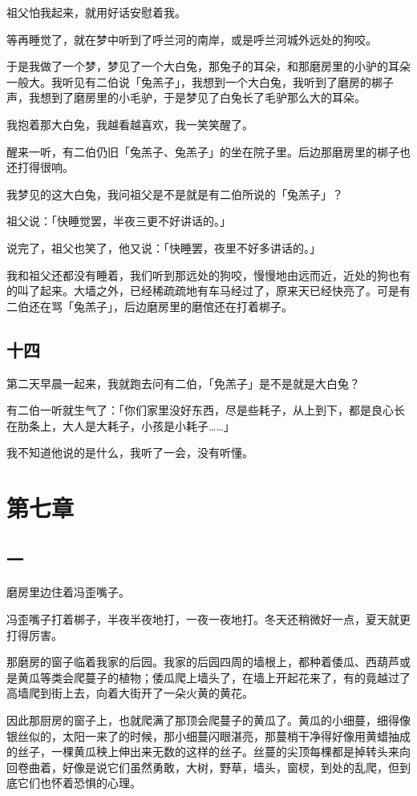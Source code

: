 \documentclass[UTF8]{ctexart}
\begin{document}
祖父怕我起来，就用好话安慰着我。

等再睡觉了，就在梦中听到了呼兰河的南岸，或是呼兰河城外远处的狗咬。

于是我做了一个梦，梦见了一个大白兔，那兔子的耳朵，和那磨房里的小驴的耳朵一般大。我听见有二伯说「兔羔子」，我想到一个大白兔，我听到了磨房的梆子声，我想到了磨房里的小毛驴，于是梦见了白兔长了毛驴那么大的耳朵。

我抱着那大白兔，我越看越喜欢，我一笑笑醒了。

醒来一听，有二伯仍旧「兔羔子、兔羔子」的坐在院子里。后边那磨房里的梆子也还打得很响。

我梦见的这大白兔，我问祖父是不是就是有二伯所说的「兔羔子」？

祖父说：「快睡觉罢，半夜三更不好讲话的。」

说完了，祖父也笑了，他又说：「快睡罢，夜里不好多讲话的。」

我和祖父还都没有睡着，我们听到那远处的狗咬，慢慢地由远而近，近处的狗也有的叫了起来。大墙之外，已经稀疏疏地有车马经过了，原来天已经快亮了。可是有二伯还在骂「兔羔子」，后边磨房里的磨倌还在打着梆子。

\subsection{十四}

第二天早晨一起来，我就跑去问有二伯，「免羔子」是不是就是大白兔？

有二伯一听就生气了：「你们家里没好东西，尽是些耗子，从上到下，都是良心长在肋条上，大人是大耗子，小孩是小耗子……」

我不知道他说的是什么，我听了一会，没有听懂。

\section{第七章}

\subsection{一}

磨房里边住着冯歪嘴子。

冯歪嘴子打着梆子，半夜半夜地打，一夜一夜地打。冬天还稍微好一点，夏天就更打得厉害。

那磨房的窗子临着我家的后园。我家的后园四周的墙根上，都种着倭瓜、西葫芦或是黄瓜等类会爬蔓子的植物；倭瓜爬上墙头了，在墙上开起花来了，有的竟越过了高墙爬到街上去，向着大街开了一朵火黄的黄花。

因此那厨房的窗子上，也就爬满了那顶会爬蔓子的黄瓜了。黄瓜的小细蔓，细得像银丝似的，太阳一来了的时候，那小细蔓闪眼湛亮，那蔓梢干净得好像用黄蜡抽成的丝子，一棵黄瓜秧上伸出来无数的这样的丝子。丝蔓的尖顶每棵都是掉转头来向回卷曲着，好像是说它们虽然勇敢，大树，野草，墙头，窗棂，到处的乱爬，但到底它们也怀着恐惧的心理。
\end{document}
